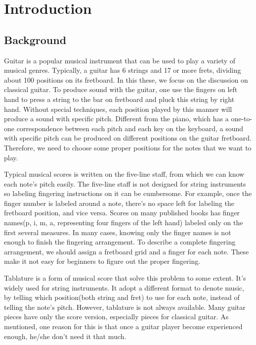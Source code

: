 \chapter{Introduction}

\label{Chapter:Introduction}

\section{Background}
Guitar is a popular musical instrument that can be used to play a variety of musical genres.
Typically, a guitar has 6 strings and 17 or more frets, dividing about 100 positions on its fretboard. In this these, we focus on the discussion on classical guitar.
To produce sound with the guitar, one use the fingers on left hand to press a string to the bar on fretboard and pluck this string by right hand.
Without special techniques, each position played by this manner will produce a sound with specific pitch.
Different from the piano, which has a one-to-one correspondence between each pitch and each key on the keyboard, a sound with specific pitch can be produced on different positions on the guitar fretboard.
Therefore, we need to choose some proper positions for the notes that we want to play.

Typical musical scores is written on the five-line staff, from which we can know each note's pitch easily.
The five-line staff is not designed for string instruments so labeling fingering instructions on it
can be cumbersome. For example, once the finger number is labeled around a note, there's no space left for labeling the fretboard position, and vice versa. Scores on many published books has finger names(p, i, m, a, representing four fingers of the left hand) labeled only on the first several measures. In many cases, knowing only the finger names is not enough to finish the fingering arrangement. To describe a complete fingering arrangement, we should assign a fretboard grid and a finger for each note. These make it not easy for beginners to figure out the proper fingering.

Tablature is a form of musical score that solve this problem to some extent.
It's widely used for string instruments.
It adopt a different format to denote music, by telling which position(both string and fret) to use for each note, instead of telling the note's pitch.
However, tablature is not always available. Many guitar pieces have only the score version, especially pieces for classical guitar.
As \citep{constructing-system} mentioned, one reason for this is that once a guitar player become experienced enough, he/she don't need it that much.


